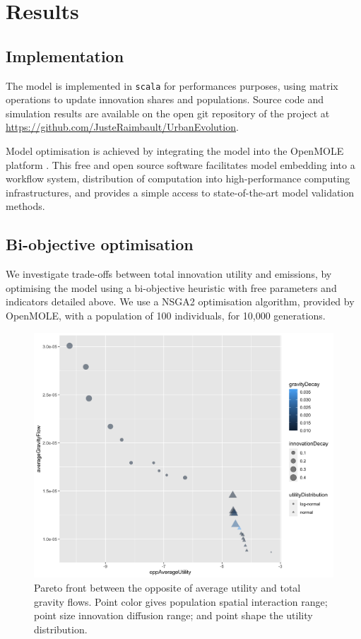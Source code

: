 \documentclass[final,5p,times,twocolumn,authoryear]{elsarticle}
\begin{document}
\section{Results}

\subsection{Implementation}

The model is implemented in \texttt{scala} for performances purposes, using matrix operations to update innovation shares and populations. Source code and simulation results are available on the open git repository of the project at \url{https://github.com/JusteRaimbault/UrbanEvolution}.

Model optimisation is achieved by integrating the model into the OpenMOLE platform \cite{reuillon2013openmole}. This free and open source software facilitates model embedding into a workflow system, distribution of computation into high-performance computing infrastructures, and provides a simple access to state-of-the-art model validation methods.


\subsection{Bi-objective optimisation}

We investigate trade-offs between total innovation utility and emissions, by optimising the model using a bi-objective heuristic with free parameters and indicators detailed above. We use a NSGA2 optimisation algorithm, provided by OpenMOLE, with a population of 100 individuals, for 10,000 generations.

\begin{figure}
	\centering
	\includegraphics[width=\linewidth]{figures/pareto-oppAverageUtility-averageGravityFlow_color-gravityDecay_size-innovationDecay_shape-utilityDistribution.png}
	\caption{Pareto front between the opposite of average utility and total gravity flows. Point color gives population spatial interaction range; point size innovation diffusion range; and point shape the utility distribution.\label{fig:fig1}}
\end{figure}
\end{document}
